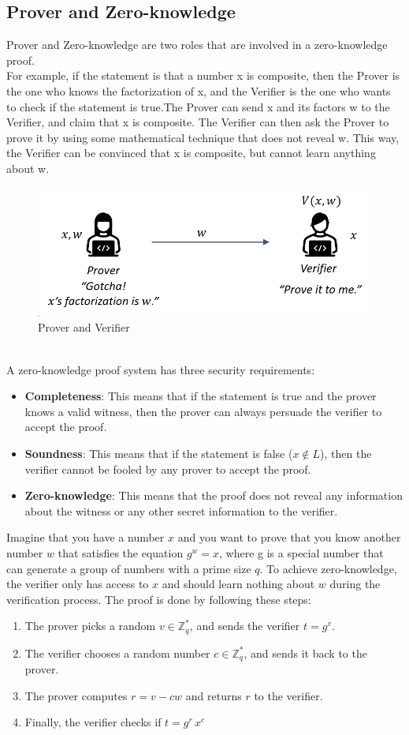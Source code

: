 \subsection{Prover and Zero-knowledge}
Prover and Zero-knowledge are two roles that are involved in a zero-knowledge proof. \\
For example, if the statement is that a number x is composite, then the Prover is the one who knows the factorization of x, and the Verifier is the one who wants to check if the statement is true.The Prover can send x and its factors w to the Verifier, and claim that x is composite. The Verifier can then ask the Prover to prove it by using some mathematical technique that does not reveal w. This way, the Verifier can be convinced that x is composite, but cannot learn anything about w.
\begin{figure}[h!]
	\centering
	\includegraphics[width=0.5\linewidth]{Fig/19/F6}
	\caption{Prover and Verifier}
	\label{fig:L19_f6}
\end{figure}\\
A zero-knowledge proof system has three security requirements:
\begin{itemize}
	\item \textbf{Completeness}: This means that if the statement is true and the prover knows a valid witness, then the prover can always persuade the verifier to accept the proof.
	\item \textbf{Soundness}: This means that if the statement is false ($x \notin L$), then the verifier cannot be fooled by any prover to accept the proof.
	\item \textbf{Zero-knowledge}: This means that the proof does not reveal any information about the witness or any other secret information to the verifier.
\end{itemize}
Imagine that you have a number $x$ and you want to prove that you know another number $w$ that satisfies the equation $g^w = x$, where g is a special number that can generate a group of numbers with a prime size $q$. To achieve zero-knowledge, the verifier only has access to $x$ and should learn nothing about $w$ during the verification process.
The proof is done by following these steps:
\begin{enumerate}
	\item The prover picks a random $v \in \mathbb{Z}^*_q$, and sends the verifier $t = g^v$.
	\item The verifier chooses a random number $c \in \mathbb{Z}^*_q$, and sends it back to the prover.
	\item The prover computes $r = v - cw$ and returns $r$ to the verifier.
	\item Finally, the verifier checks if $t = g^r \, x^c$
\end{enumerate}

